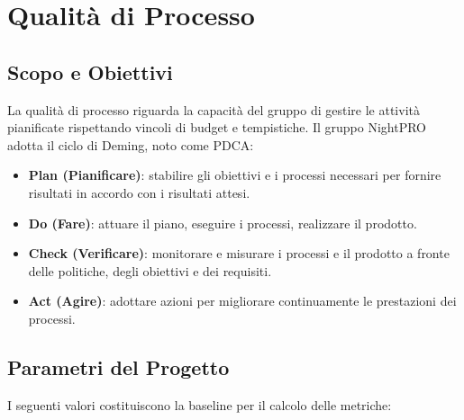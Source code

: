\documentclass[a4paper,11pt,oneside]{scrartcl}
\begin{document}
\newpage
\section{Qualità di Processo}

\subsection{Scopo e Obiettivi}
La qualità di processo riguarda la capacità del gruppo di gestire le attività pianificate rispettando vincoli di budget e tempistiche. Il gruppo NightPRO adotta il ciclo di Deming{\scriptsize{}}, noto come PDCA{\scriptsize{}}:

\begin{itemize}
    \item \textbf{Plan (Pianificare)}: stabilire gli obiettivi e i processi necessari per fornire risultati in accordo con i risultati attesi.
    \item \textbf{Do (Fare)}: attuare il piano, eseguire i processi, realizzare il prodotto.
    \item \textbf{Check (Verificare)}: monitorare e misurare i processi e il prodotto a fronte delle politiche, degli obiettivi e dei requisiti.
    \item \textbf{Act (Agire)}: adottare azioni per migliorare continuamente le prestazioni dei processi.
\end{itemize}

\subsection{Parametri del Progetto}
I seguenti valori costituiscono la baseline{\scriptsize{}} per il calcolo delle metriche:
\end{document}
